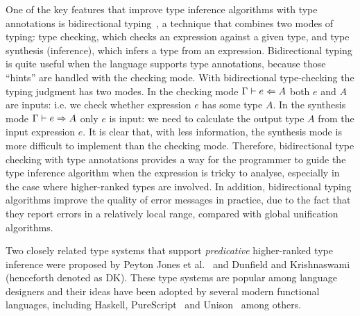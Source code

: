 One of the key features that improve type inference algorithms with type annotations
is bidirectional typing~\citep{pierce:local}, a technique that combines two modes of typing:
type checking, which checks an expression against a given type,
and type synthesis (inference), which infers a type from an expression.
Bidirectional typing is quite useful when the language supports type annotations,
because those ``hints'' are handled with the checking mode.
With bidirectional type-checking the typing judgment has two modes.
In the checking mode $\Gamma \vdash e \Leftarrow A$ both $e$ and $A$ are inputs:
i.e. we check whether expression $e$ has some type $A$.
In the synthesis mode $\Gamma \vdash e \Rightarrow A$ only $e$ is input:
we need to calculate the output type $A$ from the input expression $e$.
It is clear that, with less information,
the synthesis mode is more difficult to implement than the checking mode.
Therefore, bidirectional type checking with type annotations
provides a way for the programmer to guide
the type inference algorithm when the expression is tricky to analyse,
especially in the case where higher-ranked types are involved.
In addition, bidirectional typing algorithms
improve the quality of error messages in practice,
due to the fact that they report errors in a relatively local range,
compared with global unification algorithms.

Two closely related type systems that 
support \emph{predicative} higher-ranked type inference were proposed 
by Peyton Jones et al.~\citep{jones2007practical} and Dunfield and
Krishnaswami~\citep{dunfield2013complete} (henceforth denoted as DK). 
These type systems are
popular among language designers and their ideas have been adopted by
several modern functional languages, including Haskell, PureScript~\citep{PureScript} and
Unison~\citep{Unison} among others.

